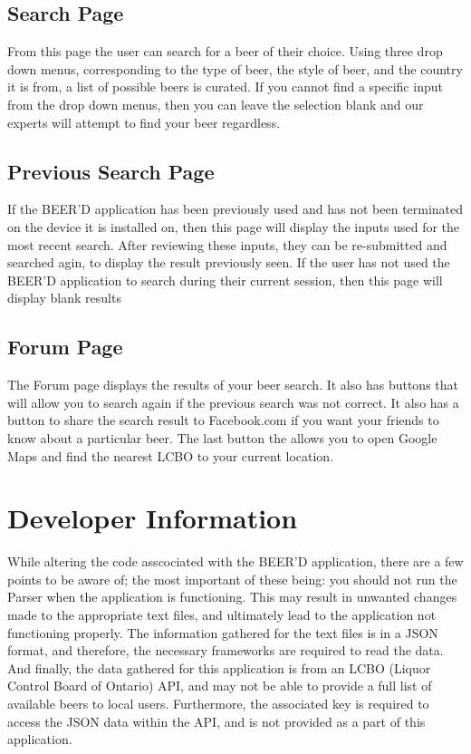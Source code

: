 \documentclass[]{article}
\begin{document}
\subsection{Search Page}
\label{sec:search_page}
From this page the user can search for a beer of their choice. Using three drop down menus, corresponding to the type of beer, the style of beer, and the country it is from, a list of possible beers is curated. If you cannot find a specific input from the drop down menus, then you can leave the selection blank and our experts will attempt to find your beer regardless.

\subsection{Previous Search Page}
\label{sec:search_page}
If the BEER'D application has been previously used and has not been terminated on the device it is installed on, then this page will display the inputs used for the most recent search. After reviewing these inputs, they can be re-submitted and searched agin, to display the result previously seen. If the user has not used the BEER'D application to search during their current session, then this page will display blank results

\subsection{Forum Page}
\label{sec:forum_page}
The Forum page displays the results of your beer search. It also has buttons that will allow you to search again if the previous 
search was not correct. It also has a button to share the search result to Facebook.com if you want your friends to know about
a particular beer. The last button the allows you to open Google Maps and find the nearest LCBO to your current location. 

\section{Developer Information}
\label{sec:developer_information}
While altering the code asscociated with the BEER'D application, there are a few points to be aware of; the most important of these being: you should not run the Parser when the application is functioning. This may result in unwanted changes made to the appropriate text files, and ultimately lead to the application not functioning properly. The information gathered for the text files is in a JSON format, and therefore, the necessary frameworks are required to read the data. And finally, the data gathered for this application is from an LCBO (Liquor Control Board of Ontario) API, and may not be able to provide a full list of available beers to local users. Furthermore, the associated key is required to access the JSON data within the API, and is not provided as a part of this application.
\end{document}

